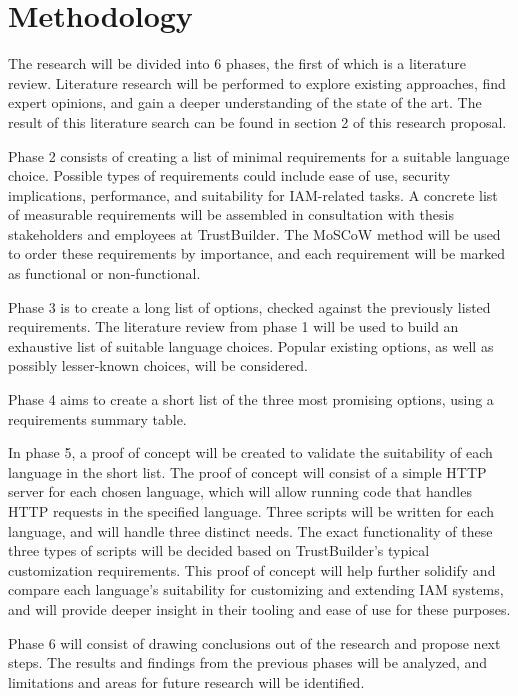 \section{Methodology}%
\label{sec:methodology}

The research will be divided into 6 phases, the first of which is a literature review. Literature research will be performed to explore existing approaches, find expert opinions, and gain a deeper understanding of the state of the art. The result of this literature search can be found in section 2 of this research proposal.

Phase 2 consists of creating a list of minimal requirements for a suitable language choice. Possible types of requirements could include ease of use, security implications, performance, and suitability for IAM-related tasks. A concrete list of measurable requirements will be assembled in consultation with thesis stakeholders and employees at TrustBuilder. The MoSCoW method will be used to order these requirements by importance, and each requirement will be marked as functional or non-functional.

Phase 3 is to create a long list of options, checked against the previously listed requirements. The literature review from phase 1 will be used to build an exhaustive list of suitable language choices. Popular existing options, as well as possibly lesser-known choices, will be considered.

Phase 4 aims to create a short list of the three most promising options, using a requirements summary table.

In phase 5, a proof of concept will be created to validate the suitability of each language in the short list. The proof of concept will consist of a simple HTTP server for each chosen language, which will allow running code that handles HTTP requests in the specified language. Three scripts will be written for each language, and will handle three distinct needs. The exact functionality of these three types of scripts will be decided based on TrustBuilder's typical customization requirements. This proof of concept will help further solidify and compare each language's suitability for customizing and extending IAM systems, and will provide deeper insight in their tooling and ease of use for these purposes.

Phase 6 will consist of drawing conclusions out of the research and propose next steps. The results and findings from the previous phases will be analyzed, and limitations and areas for future research will be identified.

